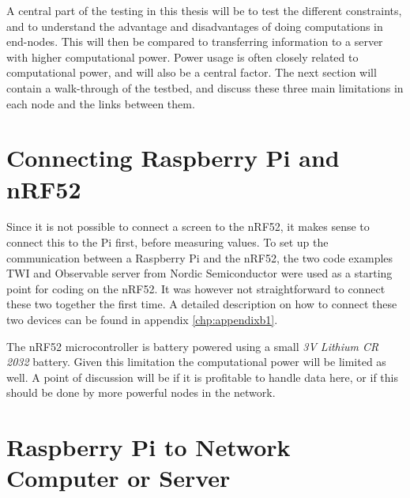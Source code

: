\noindent A central part of the testing in this thesis will be to test the different constraints, and to understand the advantage and disadvantages of doing computations in end-nodes. This will then be compared to transferring  information to a server with higher computational power. Power usage is often closely related to computational power, and will also be a central factor. The next section will contain a walk-through of the testbed, and discuss these three main limitations in each node and the links between them.


\section{Connecting Raspberry Pi and nRF52}


\noindent Since it is not possible to connect a screen to the \gls{nRF52}, it makes sense to connect this to the Pi first, before measuring values. To set up the communication between a \gls{Raspberry Pi} and the \gls{nRF52}, the two code examples TWI and Observable server from Nordic Semiconductor were used as a starting point for coding on the nRF52. It was however not straightforward to connect these two together the first time. A detailed description on how to connect these two devices can be found in appendix \ref{chp:appendixb1}. 
  

\noindent The nRF52 microcontroller is battery powered using a small \textit{3V Lithium CR 2032} battery. Given this limitation the computational power will be limited as well. A point of discussion will be if it is profitable to handle data here, or if this should be done by more powerful nodes in the network. 

\section{Raspberry Pi to Network Computer or Server} 

